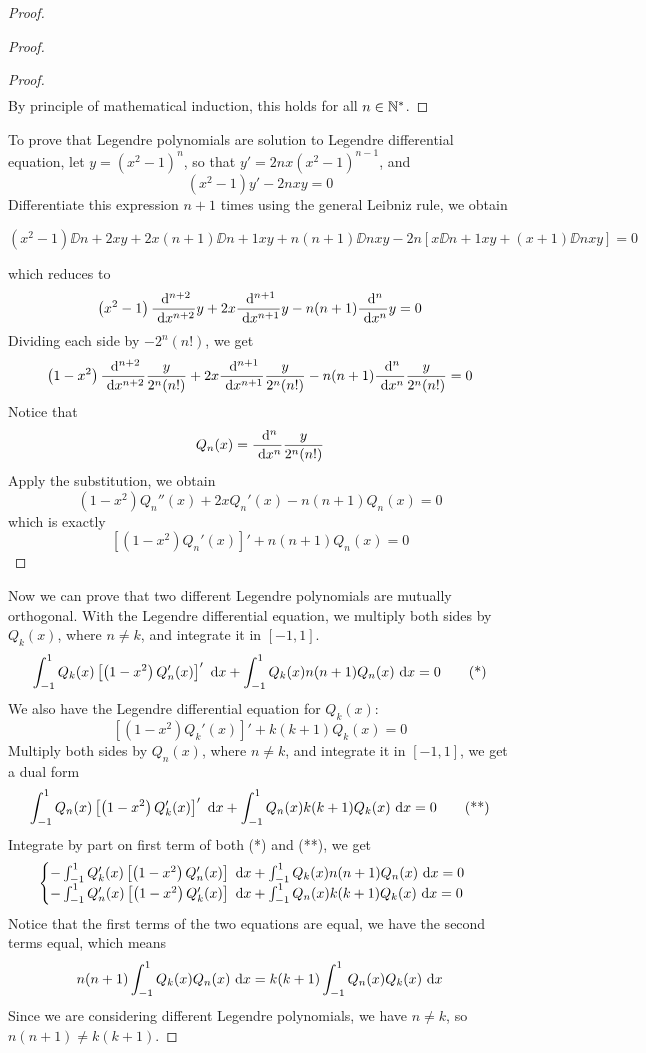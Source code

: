 \begin{enumerate}
\begin{proof}
\begin{proof}
\begin{proof}
\begin{align*}
	\end{align*}
	By principle of mathematical induction, this holds for all \(n\in\mathbb{N}^*\).
	\end{proof}
	To prove that Legendre polynomials are solution to Legendre differential equation, let \(y=\left(x^2-1\right)^n\), so that \sloppy \(y'=2nx\left(x^2-1\right)^{n-1}\), and 
	\[ \left(x^2-1\right)y'-2nxy=0 \]
	Differentiate this expression \(n+1\) times using the general Leibniz rule, we obtain
	\begin{small}
		\[ \left(x^2-1\right)\DD{n+2}{x}{y}+2x(n+1)\DD{n+1}{x}{y}+n(n+1)\DD{n}{x}{y}-2n\left[x\DD{n+1}{x}{y}+(x+1)\DD{n}{x}{y}\right]=0 \]
	\end{small}
	which reduces to 
	\[ \left(x^2-1\right)\frac{~\mathrm{d}^{n+2}}{~\mathrm{d}{x}^{n+2}}y+2x\frac{~\mathrm{d}^{n+1}}{~\mathrm{d}{x}^{n+1}}y-n(n+1)\frac{~\mathrm{d}^{n}}{~\mathrm{d}{x}^{n}}y=0 \]
	Dividing each side by \(-2^n(n!)\), we get
	\[ \left(1-x^2\right)\frac{~\mathrm{d}^{n+2}}{~\mathrm{d}{x}^{n+2}}\frac{y}{2^n(n!)}+2x\frac{~\mathrm{d}^{n+1}}{~\mathrm{d}{x}^{n+1}}\frac{y}{2^n(n!)}-n(n+1)\frac{~\mathrm{d}^{n}}{~\mathrm{d}{x}^{n}}\frac{y}{2^n(n!)}=0 \]
	Notice that
	\[ Q_n(x)=\frac{~\mathrm{d}^{n}}{~\mathrm{d}{x}^{n}}\frac{y}{2^n(n!)} \]
	Apply the substitution, we obtain
	\[ \left(1-x^2\right)Q_n''(x)+2xQ_n'(x)-n(n+1)Q_n(x)=0 \]
	which is exactly
	\[ \left[\left(1-x^2\right)Q_n'(x)\right]'+n(n+1)Q_n(x)=0 \]
	\end{proof}
	Now we can prove that two different Legendre polynomials are mutually orthogonal.
	With the Legendre differential equation, we multiply both sides by \(Q_k(x)\), where \(n\neq k\), and integrate it in \([-1,1]\).
	\[ \int_{-1}^{1} Q_k(x)\left[\left(1-x^2\right)Q_n'(x)\right]'~\mathrm{d} x + \int_{-1}^{1}Q_k(x)n(n+1)Q_n(x)~\mathrm{d} x=0 \tag{*} \]
	We also have the Legendre differential equation for \(Q_k(x)\):
	\[ \left[\left(1-x^2\right)Q_k'(x)\right]'+k(k+1)Q_k(x)=0 \]
	Multiply both sides by \(Q_n(x)\), where \(n\neq k\), and integrate it in \([-1,1]\), we get a dual form
	\[ \int_{-1}^{1} Q_n(x)\left[\left(1-x^2\right)Q_k'(x)\right]'~\mathrm{d} x + \int_{-1}^{1}Q_n(x)k(k+1)Q_k(x)~\mathrm{d} x=0 \tag{**} \]
	Integrate by part on first term of both (*) and (**), we get
	\[\begin{cases}
	-\int_{-1}^{1}Q_k'(x)\left[\left(1-x^2\right)Q_n'(x)\right]~\mathrm{d} x+\int_{-1}^{1}Q_k(x)n(n+1)Q_n(x)~\mathrm{d} x=0\\
	-\int_{-1}^{1}Q_n'(x)\left[\left(1-x^2\right)Q_k'(x)\right]~\mathrm{d} x+\int_{-1}^{1}Q_n(x)k(k+1)Q_k(x)~\mathrm{d} x=0
	\end{cases}\] 
	Notice that the first terms of the two equations are equal, we have the second terms equal, which means
	\[ n(n+1)\int_{-1}^{1}Q_k(x)Q_n(x)~\mathrm{d} x=k(k+1)\int_{-1}^{1}Q_n(x)Q_k(x)~\mathrm{d} x \]
	Since we are considering different Legendre polynomials, we have \(n\neq k\), so \(n(n+1)\neq k(k+1)\).

\end{proof}
\end{enumerate}
